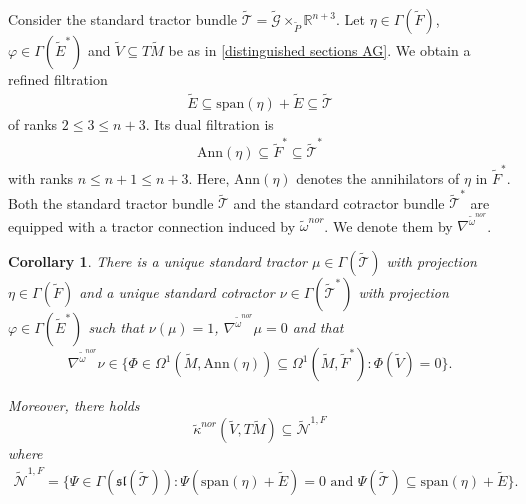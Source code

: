 \documentclass[11pt]{amsart}
\newtheorem{corollary}[proposition]{Corollary}
\begin{document}
Consider the standard tractor bundle $\tilde{\mathcal T}=\tilde{\mathcal G}\times_{\tilde P}\mathbb R^{n+3}$. Let $\eta\in\Gamma(\tilde F)$, $\varphi\in\Gamma(\tilde E^*)$ and $\tilde V\subseteq T\tilde M$ be as in \cref{distinguished sections AG}. We obtain a refined filtration
\begin{align*}
\tilde E\subseteq\mathrm{span}(\eta)+\tilde E\subseteq \tilde{\mathcal T}
\end{align*}
of ranks $2\leq 3\leq n+3$. Its dual filtration is
\begin{align*}\mathrm{Ann}(\eta)\subseteq \tilde F^*\subseteq \tilde{\mathcal T}^*
\end{align*}
with ranks $n\leq n+1\leq n+3$. Here, $\mathrm{Ann}(\eta)$ denotes the annihilators of $\eta$ in $\tilde F^*$. Both the standard tractor bundle $\tilde{\mathcal T}$ and the standard cotractor bundle $\tilde{\mathcal T}^*$ are equipped with a tractor connection induced by $\tilde\omega^{nor}$. We denote them by $\nabla^{\tilde\omega^{nor}}$.
\begin{corollary}\label{tractor property AG}
There is a unique standard tractor $\mu\in\Gamma(\tilde{\mathcal T})$ with projection $\eta\in\Gamma(\tilde F)$ and a unique standard cotractor $\nu\in\Gamma(\tilde{\mathcal T}^*)$ with projection $\varphi\in\Gamma(\tilde E^*)$ such that $\nu(\mu)=1$, $\nabla^{\tilde\omega^{nor}}\mu=0$ and that
\[\nabla^{\tilde\omega^{nor}}\nu\in\{\Phi\in\Omega^1(\tilde M,\mathrm{Ann}(\eta))\subseteq\Omega^1(\tilde M,\tilde F^*):\Phi(\tilde V)=0\}.\]

Moreover, there holds
\[\tilde\kappa^{nor}(\tilde V,T\tilde M)\subseteq\tilde{\mathcal N}^{1,F}\]
where
\begin{align*}\tilde{\mathcal N}^{1,F}=\{\Psi\in\Gamma(\mathfrak{sl}(\tilde{\mathcal T})):\Psi(\mathrm{span}(\eta)+\tilde E)=0\text{ and }\Psi(\tilde{\mathcal T})\subseteq\mathrm{span}(\eta)+\tilde E\}.\end{align*}
\end{corollary}
\end{document}
